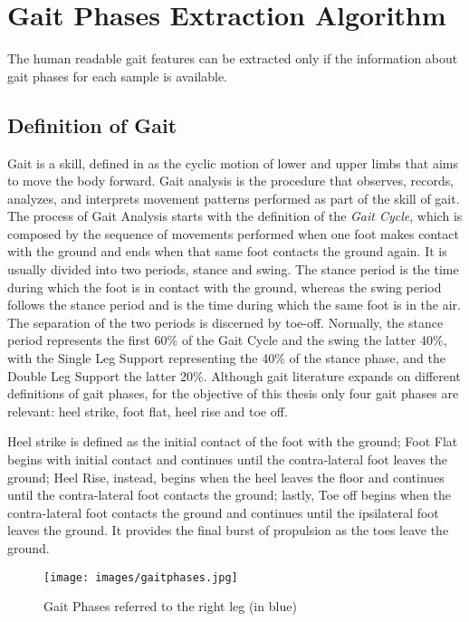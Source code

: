 \section{Gait Phases Extraction Algorithm}
The human readable gait features can be extracted only if the information about gait phases for each sample is available. 
\subsection{Definition of Gait}
Gait is a skill, defined in \cite{BIOmechanics} as the cyclic motion of lower and upper limbs that aims to move the body forward. Gait analysis is the procedure that observes, records, analyzes, and interprets movement patterns performed as part of the skill of gait.
The process of Gait Analysis starts with the definition of the \textit{Gait Cycle}, which is composed by the sequence of movements performed when one foot makes contact with the ground and ends when that same foot contacts the ground again. It is usually divided into two periods, stance and swing. The stance period is the time during which the foot is in contact with the ground, whereas the swing period follows the stance period and is the time during which the same foot is in the air. The separation of the two periods is discerned by toe-off.
Normally, the stance period represents the first
60\% of the Gait Cycle and the swing the latter 40\%, with the Single Leg Support representing the 40\% of the stance phase, and the Double Leg Support the latter 20\%. 
Although gait literature expands on different definitions of gait phases, for the objective of this thesis only four  gait phases are relevant: heel strike, foot flat, heel rise and toe off.

Heel strike is defined as the initial contact of the foot with the ground; Foot Flat begins with initial contact and continues until the contra-lateral foot leaves the ground; Heel Rise, instead, begins when the heel leaves the floor and continues until the contra-lateral foot contacts the ground; lastly, Toe off begins when the contra-lateral foot contacts the ground and continues until the ipsilateral foot leaves the ground. It provides the final burst of propulsion as the toes leave the ground.

\begin{figure}[ht!]
    \centering
    \texttt{[image: images/gaitphases.jpg]}
    \caption{Gait Phases referred to the right leg (in blue)}
    \label{fig:gaitphases}
\end{figure}

